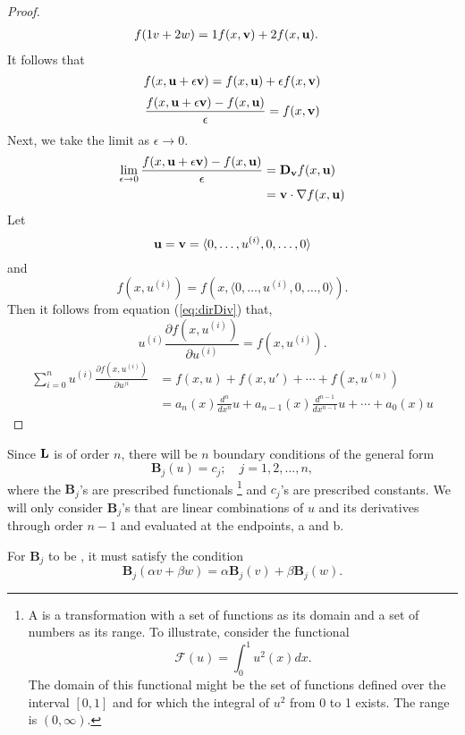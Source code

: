 \begin{proof}
\begin{equation}
\begin{split}
			f(1 v + 2 w)&= 1 f(x, \textbf{v}) + 2 f(x, \textbf{u}).
		\end{split}
	\end{equation}
	It follows that 
	\begin{equation}
		f(x, \textbf{u} + \epsilon \textbf{v}) = f(x, \textbf{u}) + \epsilon f(x, \textbf{v})
	\end{equation}
	\begin{equation}
		\frac{f(x, \textbf{u} + \epsilon \textbf{v})-f(x,\textbf{u})}{\epsilon} = f(x,\textbf{v})
	\end{equation}
	Next, we take the limit as \(\epsilon \to 0\). 
	\begin{equation}\label{eq:dirDiv}
		\begin{split}
			\lim_{\epsilon \to 0}\frac{f(x, \textbf{u} + \epsilon \textbf{v} )-f(x,\textbf{u} )}{\epsilon} &= \mathrm{\bf{D}}_{\textbf{v}} f(x,\textbf{u})\\
			&= \textbf{v} \cdot \nabla f(x,\textbf{u})
		\end{split}
	\end{equation}
	Let 
	\begin{equation}
		\textbf{u} = \textbf{v} = \langle 0, \dots, u^{(i)}, 0, \dots, 0 \rangle
	\end{equation}
	and
	\begin{equation}
		f(x,u^{(i)}) = f(x, \langle 0, \dots, u^{(i)}, 0, \dots, 0 \rangle ).
	\end{equation}
	Then it follows from equation (\ref{eq:dirDiv}) that,
	\begin{equation}
		u^{(i)}\frac{\partial f(x, u^{(i)})}{\partial u^{(i)}} = f(x,u^{(i)}).
	\end{equation}
	\begin{equation}
		\begin{split}
			\sum_{i=0}^{n} u^{(i)}\frac{\partial f(x, u^{(i)})}{\partial u^{)i}} &= f(x,u) + f(x, u') + \cdots + f(x, u^{(n)})\\
			&= a_n(x) \frac{d^n}{dx^n}u + a_{n-1}(x) \frac{d^{n-1}}{dx^{n-1}}u + \cdots + a_0(x)u
		\end{split}
	\end{equation}
\end{proof}

	Since \(\mathrm{\bf{L}}\) is of order \(n\), there will be \(n\) boundary conditions of the general form 
\begin{equation}
	\mathbf{B}_j (u) = c_j;\quad j=1,2,\dots,n,
\end{equation}
where the \(\mathbf{B}_j\)'s are prescribed functionals \footnote{A  is a transformation with a set of functions as its domain and a set of numbers as its range. To illustrate, consider the functional 
\begin{equation}
	\mathcal{F}(u) = \int_{0}^{1} u^2(x)dx.
\end{equation}
The domain of this functional might be the set of functions defined over the interval \([0,1]\) and for which the integral of \(u^2\) from 0 to 1 exists. The range is \((0, \infty)\).
} and \(c_j\)'s are prescribed constants. We will only consider \(\mathbf{B}_j\)'s that are linear combinations of \(u\) and its derivatives through order \(n-1\) and evaluated at the endpoints, a and b. 

For \(\mathbf{B}_j\) to be , it must satisfy the condition
\begin{equation}
	\mathbf{B}_j(\alpha v + \beta w) = \alpha \mathbf{B}_j (v) + \beta \mathbf{B}_j(w).
\end{equation}